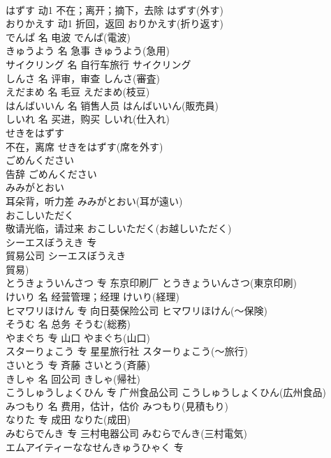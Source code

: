 \documentclass[8pt]{extreport}
\begin{document}
\begin{CJK}{UTF8}{min}
\\	はずす	动1	不在；离开；摘下，去除	はずす(外す)	
\\	おりかえす	动1	折回，返回	おりかえす(折り返す)	
\\	でんぱ	名	电波	でんぱ(電波)	
\\	きゅうよう	名	急事	きゅうよう(急用)	
\\	サイクリング	名	自行车旅行	サイクリング	
\\	しんさ	名	评审，审查	しんさ(審査)	
\\	えだまめ	名	毛豆	えだまめ(枝豆)	
\\	はんばいいん	名	销售人员	はんばいいん(販売員)	
\\	しいれ	名	买进，购买	しいれ(仕入れ)	
\\	せきをはずす	
\\	不在，离席	せきをはずす(席を外す)	
\\	ごめんください	
\\	告辞	ごめんください	
\\	みみがとおい	
\\	耳朵背，听力差	みみがとおい(耳が遠い)	
\\	おこしいただく	
\\	敬请光临，请过来	おこしいただく(お越しいただく)	
\\	シーエスぼうえき	专	
\\	貿易公司	シーエスぼうえき
\\	貿易)	
\\	とうきょういんさつ	专	东京印刷厂	とうきょういんさつ(東京印刷)	
\\	けいり	名	经营管理；经理	けいり(経理)	
\\	ヒマワリほけん	专	向日葵保险公司	ヒマワリほけん(～保険)	
\\	そうむ	名	总务	そうむ(総務)	
\\	やまぐち	专	山口	やまぐち(山口)	
\\	スターりょこう	专	星星旅行社	スターりょこう(～旅行)	
\\	さいとう	专	斉藤	さいとう(斉藤)	
\\	きしゃ	名	回公司	きしゃ(帰社)	
\\	こうしゅうしょくひん	专	广州食品公司	こうしゅうしょくひん(広州食品)	
\\	みつもり	名	费用，估计，估价	みつもり(見積もり)	
\\	なりた	专	成田	なりた(成田)	
\\	みむらでんき	专	三村电器公司	みむらでんき(三村電気)	
\\	エムアイティーななせんきゅうひゃく	专	

\end{CJK}
\end{document}
